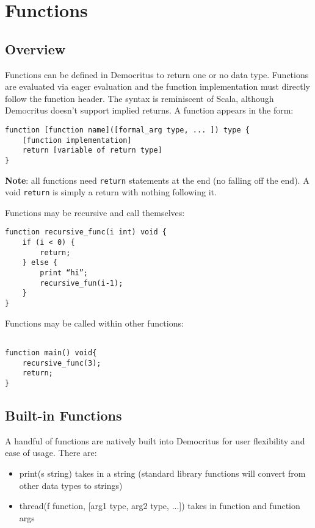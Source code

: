 \chapter{Functions}
    \section{Overview}
        Functions can be defined in Democritus to return one or no data type.  Functions are evaluated via eager evaluation and the function implementation must directly follow the function header. The syntax is reminiscent of Scala, although Democritus doesn't support implied returns.
        \vspace{5mm}
        \noindent A function appears in the form:
        
        \begin{lstlisting}
function [function name]([formal_arg type, ... ]) type {
    [function implementation]
    return [variable of return type]
}
        \end{lstlisting}

        \noindent \textbf{Note}: all functions need \texttt{return} statements at the end (no falling off the end). A void \texttt{return} is simply a return with nothing following it.

        \vspace{5mm}
        \noindent Functions may be recursive and call themselves:

        \begin{lstlisting}
function recursive_func(i int) void {
    if (i < 0) {
        return;
    } else {
        print “hi”;
        recursive_fun(i-1);
    }
}
        \end{lstlisting}


        \noindent Functions may be called within other functions:
        \begin{lstlisting}

function main() void{
    recursive_func(3);
    return;
}
        \end{lstlisting}


    \section{Built-in Functions}
        A handful of functions are natively built into Democritus for user flexibility and ease of usage. There are:
        \begin{itemize}
            \item print(s string) takes in a string (standard library functions will convert from other data types to strings)
            \item thread(f function, [arg1 type, arg2 type, ...]) takes in function and function args
        \end{itemize}
